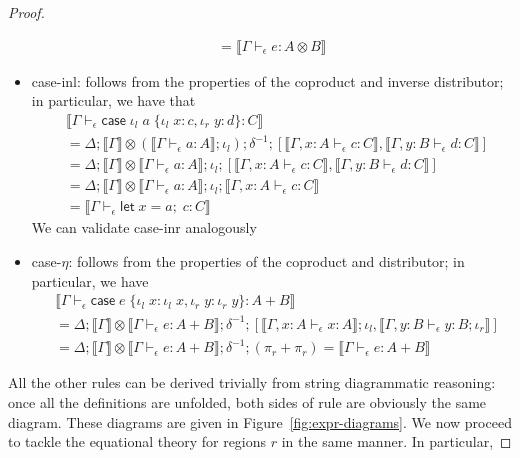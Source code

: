 \documentclass[acmsmall,screen,review]{acmart}
\newcommand{\ms}[1]{\ensuremath{\mathsf{#1}}}
\newcommand{\lto}{:}
\newcommand{\linl}[1]{\iota_l\;{#1}}
\newcommand{\linr}[1]{\iota_r\;{#1}}
\newcommand{\letexpr}[3]{\ensuremath{\ms{let}\;#1 = #2;\;#3}}
\newcommand{\caseexpr}[5]{\ms{case}\;#1\;\{\linl{#2} \lto #3, \linr{#4} \lto #5\}}
\newcommand{\bhyp}[2]{#1 : #2}
\newcommand{\hasty}[4]{#1 \vdash_{#2} #3: {#4}}
\newcommand{\brle}[1]{{\textsf{#1}}}
\newcommand{\dnt}[1]{\llbracket{#1}\rrbracket}
\begin{document}
\begin{proof}
\begin{itemize}[leftmargin=*]
\begin{align*}
       = \dnt{\hasty{\Gamma}{\epsilon}{e}{A \otimes B}}
    \end{align*}
    \item \brle{case-inl}: follows from the properties of the coproduct and inverse distributor; in
    particular, we have that
    \begin{align*}
      & \dnt{\hasty{\Gamma}{\epsilon}{\caseexpr{\linl{a}}{x}{c}{y}{d}}{C}}
      \\ &= \Delta 
      ; \dnt{\Gamma} \otimes (\dnt{\hasty{\Gamma}{\epsilon}{a}{A}} ; \iota_l)
      ; \delta^{-1} ; [
        \dnt{\hasty{\Gamma, \bhyp{x}{A}}{\epsilon}{c}{C}}, 
        \dnt{\hasty{\Gamma, \bhyp{y}{B}}{\epsilon}{d}{C}}
      ]
      \\ &= \Delta 
      ; \dnt{\Gamma} \otimes \dnt{\hasty{\Gamma}{\epsilon}{a}{A}}
      ; \iota_l ; [
        \dnt{\hasty{\Gamma, \bhyp{x}{A}}{\epsilon}{c}{C}}, 
        \dnt{\hasty{\Gamma, \bhyp{y}{B}}{\epsilon}{d}{C}}
      ]
      \\ &= \Delta 
      ; \dnt{\Gamma} \otimes \dnt{\hasty{\Gamma}{\epsilon}{a}{A}}
      ; \iota_l ; \dnt{\hasty{\Gamma, \bhyp{x}{A}}{\epsilon}{c}{C}}
      \\ &= \dnt{\hasty{\Gamma}{\epsilon}{\letexpr{x}{a}{c}}{C}}
    \end{align*}
    We can validate \brle{case-inr} analogously
    \item \brle{case-$\eta$}: follows from the properties of the coproduct and distributor; in
    particular, we have
    \begin{align*}
      & \dnt{\hasty{\Gamma}{\epsilon}{\caseexpr{e}{x}{\linl{x}}{y}{\linr{y}}}{A + B}} \\
      &= \Delta ; \dnt{\Gamma} \otimes \dnt{\hasty{\Gamma}{\epsilon}{e}{A + B}} ; \delta^{-1} ; [
        \dnt{\hasty{\Gamma, \bhyp{x}{A}}{\epsilon}{x}{A}};\iota_l,
        \dnt{\hasty{\Gamma, \bhyp{y}{B}}{\epsilon}{y}{B};\iota_r}
      ] \\
      &= \Delta ; \dnt{\Gamma} \otimes \dnt{\hasty{\Gamma}{\epsilon}{e}{A + B}} 
                ; \delta^{-1} ; (\pi_r + \pi_r)
      = \dnt{\hasty{\Gamma}{\epsilon}{e}{A + B}} 
    \end{align*}
  \end{itemize}
  All the other rules can be derived trivially from string diagrammatic reasoning: once all the
  definitions are unfolded, both sides of rule are obviously the same diagram. These diagrams are
  given in Figure~\ref{fig:expr-diagrams}.
  We now proceed to tackle the equational theory for regions $r$ in the same manner. In particular,

\end{proof}
\end{document}
